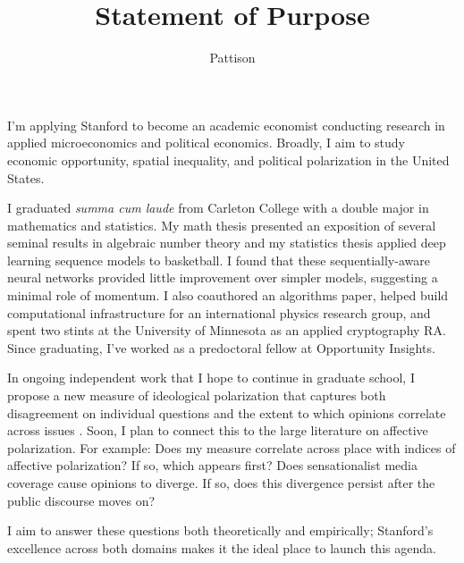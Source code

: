 \documentclass{grad-statement}
\author{Pattison}
\title{Statement of Purpose}
\begin{document}
\noindent
I'm applying Stanford to become an academic economist conducting research in applied microeconomics and political economics.
Broadly, I aim to study economic opportunity, spatial inequality, and political polarization in the United States.

I graduated \emph{summa cum laude} from Carleton College with a double major in mathematics and statistics.
My math thesis presented an exposition of several seminal results in algebraic number theory and my statistics thesis applied deep learning sequence models to basketball.
I found that these sequentially-aware neural networks provided little improvement over simpler models, suggesting a minimal role of momentum.
I also coauthored an algorithms paper, helped build computational infrastructure for an international physics research group, and spent two stints at the University of Minnesota as an applied cryptography RA.
Since graduating, I've worked as a predoctoral fellow at Opportunity Insights.

In ongoing independent work that I hope to continue in graduate school, I propose a new measure of ideological polarization that captures both disagreement on individual questions and the extent to which opinions correlate across issues \parencite{pattison-2025-polarization}.
Soon, I plan to connect this to the large literature on affective polarization.
For example:
Does my measure correlate across place with indices of affective polarization?
If so, which appears first?
Does sensationalist media coverage cause opinions to diverge.
If so, does this divergence persist after the public discourse moves on?

I aim to answer these questions both theoretically and empirically; Stanford's excellence across both domains makes it the ideal place to launch this agenda.

\printbibliography
\end{document}
